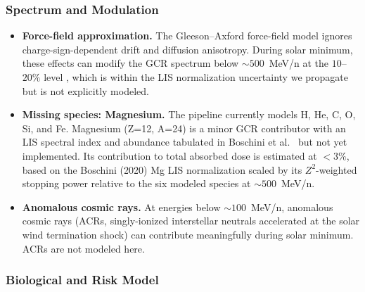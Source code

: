 \subsubsection{Spectrum and Modulation}

\begin{itemize}
  \item \textbf{Force-field approximation.}
        The Gleeson--Axford force-field model ignores charge-sign-dependent
        drift and diffusion anisotropy.
        During solar minimum, these effects can modify the GCR spectrum
        below $\sim\!500$~MeV/n at the $10$--$20\%$ level
        \citep{potgieter2013}, which is within the LIS normalization
        uncertainty we propagate but is not explicitly modeled.

  \item \textbf{Missing species: Magnesium.}
        The pipeline currently models H, He, C, O, Si, and Fe.
        Magnesium (Z=12, A=24) is a minor GCR contributor with an LIS
        spectral index and abundance tabulated in Boschini et al.\ \cite{boschini2020}
        but not yet implemented.
        Its contribution to total absorbed dose is estimated at $<3\%$,
        based on the Boschini (2020) Mg LIS normalization scaled by
        its $Z^2$-weighted stopping power relative to the six modeled
        species at $\sim\!500$~MeV/n.

  \item \textbf{Anomalous cosmic rays.}
        At energies below $\sim\!100$~MeV/n, anomalous cosmic rays
        (ACRs, singly-ionized interstellar neutrals accelerated at the
        solar wind termination shock) can contribute meaningfully during
        solar minimum.
        ACRs are not modeled here.
\end{itemize}

\subsubsection{Biological and Risk Model}
\label{sec:discuss_biology}

